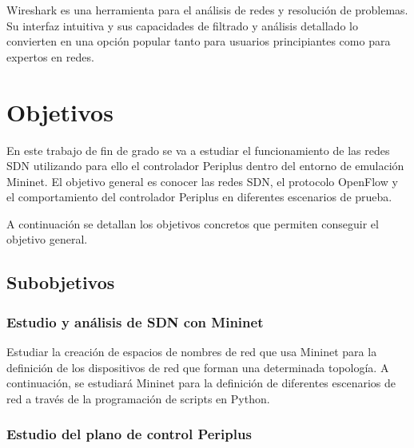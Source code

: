 \documentclass[a4paper, 12pt]{book}
\begin{document}
	
	Wireshark es una herramienta para el análisis de redes y resolución de problemas. Su interfaz intuitiva y sus capacidades de filtrado y análisis detallado lo convierten en una opción popular tanto para usuarios principiantes como para expertos en redes.
		
	
	
	\cleardoublepage %
	\chapter{Objetivos} %
	\label{chap:objetivos} %
	
	En este trabajo de fin de grado se va a estudiar el funcionamiento de las redes SDN
	utilizando para ello el controlador Periplus dentro
	del entorno de emulación Mininet. El objetivo
	general es conocer las redes SDN, el protocolo
	OpenFlow y el comportamiento del controlador
	Periplus en diferentes escenarios de prueba. 
	
	A continuación se detallan los objetivos concretos que permiten conseguir el objetivo general.
	\section{Subobjetivos}
	\subsection{Estudio y análisis de SDN con Mininet} %
	\label{sec:objetivo-mininet} %
	
	Estudiar la creación de espacios de nombres de red que usa Mininet para la definición
	de los dispositivos de red que forman una determinada topología. A continuación, se estudiará Mininet para la	definición de diferentes escenarios de	red a través de la programación de scripts en Python.
		
	
	\subsection{Estudio del plano de control Periplus}
	\label{sec:objetivos-periplus}
	
\end{document}
